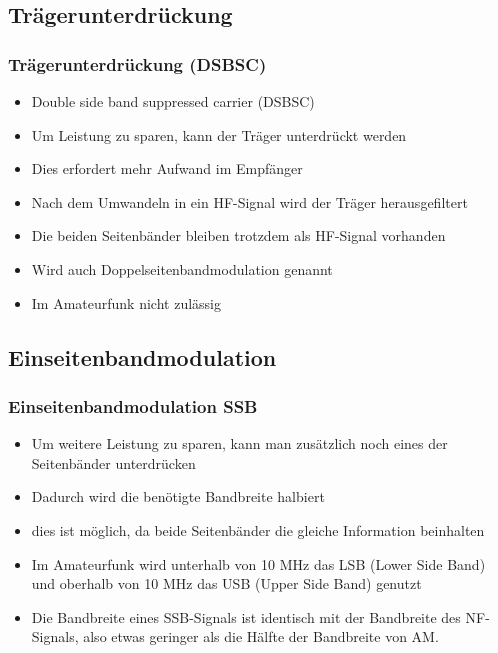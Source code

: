 \subsection[DSBSC]{Trägerunterdrückung}
\begin{frame}
  \frametitle{Trägerunterdrückung (DSBSC)}
  \begin{itemize}
    \item Double side band suppressed carrier (DSBSC)
    \item Um Leistung zu sparen, kann der Träger unterdrückt werden
    \item Dies erfordert mehr Aufwand im Empfänger
    \item Nach dem Umwandeln in ein HF-Signal wird der Träger herausgefiltert
    \item Die beiden Seitenbänder bleiben trotzdem als HF-Signal vorhanden
    \item Wird auch Doppelseitenbandmodulation genannt
    \item Im Amateurfunk nicht zulässig
  \end{itemize}
\end{frame}

\subsection[SSB]{Einseitenbandmodulation}
\begin{frame}
  \frametitle{Einseitenbandmodulation SSB}
  \begin{small}
    \begin{itemize}
      \item Um weitere Leistung zu sparen, kann man zusätzlich noch eines der Seitenbänder unterdrücken
      \item Dadurch wird die benötigte Bandbreite halbiert
      \item dies ist möglich, da beide Seitenbänder die gleiche Information beinhalten
      \item Im Amateurfunk wird unterhalb von 10 MHz das LSB (Lower Side Band) und oberhalb von 10 MHz das USB (Upper Side Band) genutzt
      \item Die Bandbreite eines SSB-Signals ist identisch mit der Bandbreite des NF-Signals, also etwas geringer als die Hälfte der Bandbreite von AM.
    \end{itemize}
  \end{small}
\end{frame}

